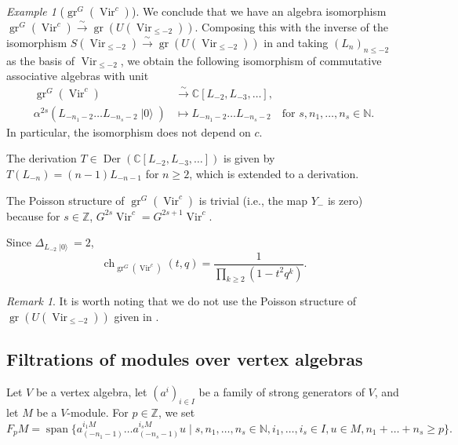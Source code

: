 \documentclass[a4paper, 12pt, reqno]{amsart}
\theoremstyle{remark}
\newtheorem{remark}[theorem]{Remark}
\newtheorem{example}[theorem]{Example}
\DeclareMathOperator{\Vir}{Vir}
\DeclareMathOperator{\gr}{gr}
\DeclareMathOperator{\ch}{ch}
\DeclareMathOperator{\vspan}{span}
\DeclareMathOperator{\vac}{|0\rangle}
\DeclareMathOperator{\Der}{Der}
\begin{document}
\begin{example}[$\gr^G(\Vir^c)$]
  We conclude that we have an algebra isomorphism $\gr^G(\Vir^c) \xrightarrow{\sim} \gr(U(\Vir_{\le -2}))$.
  Composing this with the inverse of the isomorphism $S(\Vir_{\le -2}) \xrightarrow{\sim} \gr(U(\Vir_{\le -2}))$ in  and taking $(L_n)_{n \le -2}$ as the basis of $\Vir_{\le -2}$, we obtain the following isomorphism of commutative associative algebras with unit
  \begin{align*}
    \gr^G(\Vir^c) &\xrightarrow{\sim} \mathbb{C}[L_{-2}, L_{-3}, \dots], \\
    \alpha^{2s}(L_{-n_1 - 2}\dots L_{-n_s - 2}\vac) &\mapsto L_{-n_1 - 2}\dots L_{-n_s - 2} \quad \text{for $s, n_1, \dots, n_s \in \mathbb{N}$}.
  \end{align*}
  In particular, the isomorphism does not depend on $c$.

  The derivation $T \in \Der(\mathbb{C}[L_{-2}, L_{-3}, \dots])$ is given by $T(L_{-n}) = (n - 1)L_{-n - 1}$ for $n \ge 2$, which is extended to a derivation.

  The Poisson structure of $\gr^G(\Vir^c)$ is trivial (i.e., the map $Y_-$ is zero) because for $s \in \mathbb{Z}$, $G^{2s}\Vir^c = G^{2s + 1}\Vir^c$.

  Since $\Delta_{L_{-2}\vac} = 2$,
  \begin{equation*}
    \ch_{\gr^G(\Vir^c)}(t, q) = \frac{1}{\prod_{k \ge 2}(1 - t^2q^k)}.
  \end{equation*}
\end{example}

\begin{remark}
  \label{rmk:40}
  It is worth noting that we do not use the Poisson structure of $\gr(U(\Vir_{\le -2}))$ given in .
\end{remark}

\subsection{Filtrations of modules over vertex algebras}
\label{sec:filtr-modul-over}

Let $V$ be a vertex algebra, let $(a^i)_{i \in I}$ be a family of strong generators of $V$, and let $M$ be a $V$-module.
For $p \in \mathbb{Z}$, we set
\begin{equation*}
  F_pM = \vspan\{a^{i_1M}_{(-n_1 - 1)}\dots a^{i_sM}_{(-n_s - 1)}u \mid s, n_1, \dots, n_s \in \mathbb{N}, i_1, \dots, i_s \in I, u \in M, n_1 + \dots + n_s \ge p\}.
\end{equation*}
\end{document}
